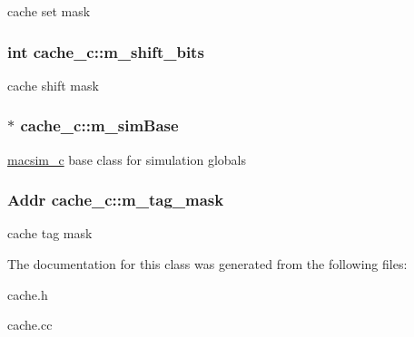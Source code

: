 \label{classcache__c_a4d0db9dfcbb07b40e41881ca8579f7b0}
cache set mask \hypertarget{classcache__c_a6e91a255d6cc037331a5f2c7e542ea46}{
\subsubsection[{m\_\-shift\_\-bits}]{\setlength{\rightskip}{0pt plus 5cm}int {\bf cache\_\-c::m\_\-shift\_\-bits}}}
\label{classcache__c_a6e91a255d6cc037331a5f2c7e542ea46}
cache shift mask \hypertarget{classcache__c_a20dcec1b4a17bc36d4218436dfe92b0c}{
\subsubsection[{m\_\-simBase}]{$\ast$ {\bf cache\_\-c::m\_\-simBase}}}
\label{classcache__c_a20dcec1b4a17bc36d4218436dfe92b0c}
\hyperlink{classmacsim__c}{macsim\_\-c} base class for simulation globals \hypertarget{classcache__c_aeebe29c74e5c87fc09e8e13756df31d0}{
\subsubsection[{m\_\-tag\_\-mask}]{\setlength{\rightskip}{0pt plus 5cm}Addr {\bf cache\_\-c::m\_\-tag\_\-mask}}}
\label{classcache__c_aeebe29c74e5c87fc09e8e13756df31d0}
cache tag mask 

The documentation for this class was generated from the following files:\begin{DoxyCompactItemize}
\item 
cache.h\item 
cache.cc\end{DoxyCompactItemize}
